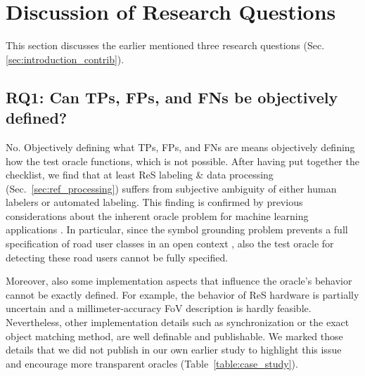 \documentclass[conference]{IEEEtran}
\begin{document}
\section{Discussion of Research Questions}
\label{sec:discussion}


This section discusses the earlier mentioned three research questions (Sec. \ref{sec:introduction_contrib}). 


\subsection{RQ1: Can TPs, FPs, and FNs be objectively defined?}
\label{sec:discussion_rq1}

No. Objectively defining what TPs, FPs, and FNs are means objectively defining how the test oracle functions, which is not possible. After having put together the checklist, we find that at least ReS labeling \& data processing (Sec.~\ref{sec:ref_processing}) suffers from subjective ambiguity of either human labelers or automated labeling. 
This finding is confirmed by previous considerations about the inherent oracle problem for machine learning applications \cite{Abrecht2021testing}. 
In particular, since the symbol grounding problem prevents a full specification of road user classes in an open context \cite{Salay2019partialspecifications, Abrecht2021testing}, also the test oracle for detecting these road users cannot be fully specified.

Moreover, also some implementation aspects that influence the oracle's behavior cannot be exactly defined.
For example, the behavior of ReS hardware is partially uncertain and a millimeter-accuracy FoV description is hardly feasible.
Nevertheless, other implementation details such as synchronization or the exact object matching method, are well definable and publishable.
We marked those details that we did not publish in our own earlier study to highlight this issue and encourage more transparent oracles (Table~\ref{table:case_study}). 





\end{document}
